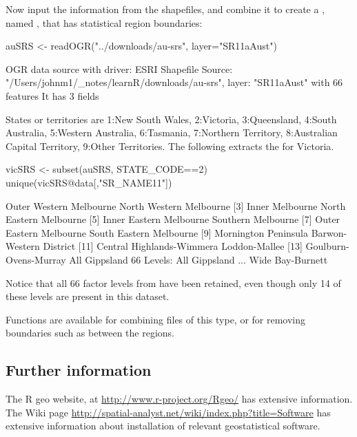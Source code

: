 {Now input the information from the shapefiles, and combine
it to create a , named ,
that has statistical region boundaries:
\begin{Schunk}
\begin{Sinput}
auSRS <- readOGR("../downloads/au-srs", layer="SR11aAust")
\end{Sinput}
\begin{Soutput}
OGR data source with driver: ESRI Shapefile 
Source: "/Users/johnm1/_notes/learnR/downloads/au-srs", layer: "SR11aAust"
with 66 features
It has 3 fields
\end{Soutput}
\end{Schunk}
States or territories are 1:New South Wales, 2:Victoria, 3:Queensland,
4:South Australia, 5:Western Australia, 6:Tasmania, 7:Northern Territory,
8:Australian Capital Territory, 9:Other Territories.
The following extracts the  for Victoria.
\begin{Schunk}
\begin{Sinput}
vicSRS <- subset(auSRS, STATE_CODE==2)
unique(vicSRS@data[,"SR_NAME11"])
\end{Sinput}
\begin{Soutput}
 [1] Outer Western Melbourne   North Western Melbourne  
 [3] Inner Melbourne           North Eastern Melbourne  
 [5] Inner Eastern Melbourne   Southern Melbourne       
 [7] Outer Eastern Melbourne   South Eastern Melbourne  
 [9] Mornington Peninsula      Barwon-Western District  
[11] Central Highlands-Wimmera Loddon-Mallee            
[13] Goulburn-Ovens-Murray     All Gippsland            
66 Levels: All Gippsland ... Wide Bay-Burnett
\end{Soutput}
\end{Schunk}
\noindent
Notice that all 66 factor levels from  have been retained,
even though only 14 of these levels are present in this dataset.

Functions are available for combining files of this type, or for
removing boundaries such as between the  regions.

\subsection*{Further information}
The R geo website, at \url{http://www.r-project.org/Rgeo/} has extensive
information.  The Wiki page
\url{http://spatial-analyst.net/wiki/index.php?title=Software} has
extensive information about installation of relevant geostatistical
software.

}
